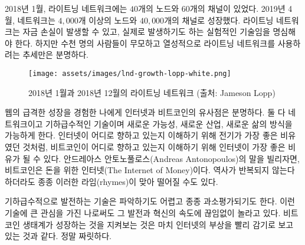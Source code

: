 \begin{comment}
	In January 2018, the lightning network had $40$ nodes and $60$
	channels~\cite{web:lightning-nodes}. In April 2019, the network grew to more
	than $4000$ nodes and around $40.000$ channels. Keep in mind that this is still
	experimental technology where loss of funds can and does occur. Yet the trend is
	clear: thousands of people are reckless and eager to use it.
\end{comment}
2018년 1월, 라이트닝 네트워크에는 $40$개의 노드와 $60$개의 채널이 있었다.\cite{web:lightning-nodes}
2019년 4월, 네트워크는 $4,000$개 이상의 노드와  $40,000$개의 채널로 성장했다.
라이트닝 네트워크는 자금 손실이 발생할 수 있고, 실제로 발생하기도 하는 실험적인 기술임을 명심해야 한다.
하지만 수천 명의 사람들이 무모하고 열성적으로 라이트닝 네트워크를 사용하려는 추세만은 분명하다. 

\begin{figure}
	\texttt{[image: assets/images/lnd-growth-lopp-white.png]}
	\caption{2018년 1월과 2018년 12월의 라이트닝 네트워크 (출처: Jameson Lopp)}
	\label{fig:lnd-growth-lopp-white.png}
\end{figure}

\begin{comment}
	To me, having lived through the meteoric rise of the web, the parallels
	between the internet and Bitcoin are obvious. Both are networks, both
	are exponential technologies, and both enable new possibilities, new
	industries, new ways of life. Just like electricity was the best
	metaphor to understand where the internet is heading, the internet might
	be the best metaphor to understand where bitcoin is heading. Or, in the
	words of Andreas Antonopoulos, Bitcoin is \textit{The Internet of Money}.
	These metaphors are a great reminder that while history doesn't repeat
	itself, it often rhymes.
\end{comment}
웹의 급격한 성장을 경험한 나에게 인터넷과 비트코인의 유사점은 분명하다.
둘 다 네트워크이고 기하급수적인 기술이며 새로운 가능성, 새로운 산업, 새로운 삶의 방식을 가능하게 한다.
인터넷이 어디로 향하고 있는지 이해하기 위해 전기가 가장 좋은 비유였던 것처럼,
비트코인이 어디로 향하고 있는지 이해하기 위해 인터넷이 가장 좋은 비유가 될 수 있다.
안드레아스 안토노풀로스(Andreas Antonopoulos)의 말을 빌리자면, 비트코인은 돈을 위한 인터넷(The Internet of Money)이다.
역사가 반복되지 않는다 하더라도 종종 이러한 라임(rhymes)이 맞아 떨어질 수도 있다.

\begin{comment}
	Exponential technologies are hard to grasp and often underestimated.
	Even though I have a great interest in such technologies, I am
	constantly surprised by the pace of progress and innovation. Watching
	the Bitcoin ecosystem grow is like watching the rise of the internet in
	fast-forward. It is exhilarating.
\end{comment}
기하급수적으로 발전하는 기술은 파악하기도 어렵고 종종 과소평가되기도 한다.
이런 기술에 큰 관심을 가진 나로써도 그 발전과 혁신의 속도에 끊임없이 놀라고 있다.
비트코인 생태계가 성장하는 것을 지켜보는 것은 마치 인터넷의 부상을 빨리 감기로 보고 있는 것과 같다.
정말 짜릿하다.

